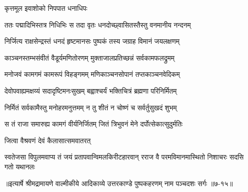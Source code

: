\onelineshloka
{कृत्तमूल इवाशोको निपपात धनाधिपः} %

\twolineshloka
{ततः पद्मादिभिस्तत्र निधिभिः स तदा वृतः}
{धनदोच्छ्वासितस्तैस्तु वनमानीय नन्दनम्} %

\twolineshloka
{निर्जित्य राक्षसेन्द्रस्तं धनदं हृष्टमानसः}
{पुष्पकं तस्य जग्राह विमानं जयलक्षणम्} %

\twolineshloka
{काञ्चनस्तम्भसंवीतं वैडूर्यमणितोरणम्}
{मुक्ताजालप्रतिच्छन्नं सर्वकामफलद्रुमम्} %

\twolineshloka
{मनोजवं कामगमं कामरूपं विहङ्गमम्}
{मणिकाञ्चनसोपानं तप्तकाञ्चनवेदिकम्} %

\twolineshloka
{देवोपवाह्यमक्षय्यं सदादृष्टिमनःसुखम्}
{बह्वाश्चर्यं भक्तिचित्रं ब्रह्मणा परिनिर्मितम्} %

\twolineshloka
{निर्मितं सर्वकामैस्तु मनोहरमनुत्तमम्}
{न तु शीतं न चोष्णं च सर्वर्तुसुखदं शुभम्} %

\twolineshloka
{स तं राजा समारुह्य कामगं वीर्यनिर्जितम्}
{जितं त्रिभुवनं मेने दर्पोत्सेकात्सुदुर्मतिः} %

\onelineshloka
{जित्वा वैश्रवणं देवं कैलासात्समवातरत्} %

\twolineshloka
{स्वतेजसा विपुलमवाप्य तं जयं प्रतापवान्विमलकिरीटहारवान्}
{रराज वै परमविमानमास्थितो निशाचरः सदसि गतो यथानलः} %


॥इत्यार्षे श्रीमद्रामायणे वाल्मीकीये आदिकाव्ये उत्तरकाण्डे पुष्पकहरणम् नाम पञ्चदशः सर्गः ॥७-१५॥
